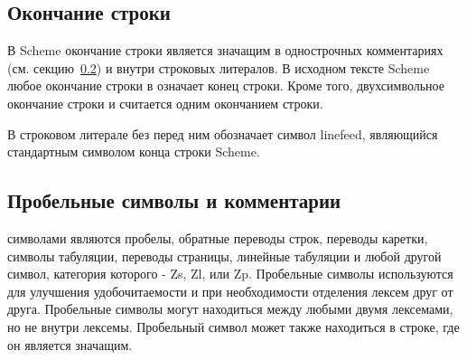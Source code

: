 \subsection{Окончание строки}
\label{lineendings}

В Scheme окончание строки является значащим в однострочных комментариях
(см. секцию~\ref{whitespaceandcomments}) и внутри строковых литералов. В исходном тексте Scheme
любое окончание строки в  означает конец строки. Кроме того, двухсимвольное
окончание строки   и   считается одним окончанием строки.

В строковом литерале  без {\cf\backwhack} перед ним обозначает
символ linefeed, являющийся стандартным символом конца строки Scheme.

\subsection{Пробельные символы и комментарии}
\label{whitespaceandcomments}

 символами являются пробелы, обратные переводы строк, переводы каретки, символы
табуляции, переводы страницы, линейные табуляции и любой другой символ, категория которого - Zs,
Zl, или Zp. Пробельные символы используются для улучшения удобочитаемости и при необходимости
отделения лексем друг от друга. Пробельные символы могут находиться между любыми двумя
лексемами, но не внутри лексемы. Пробельный символ может также находиться в строке, где он
является значащим.

